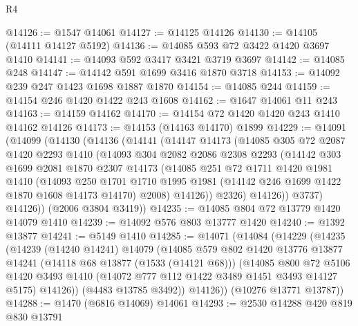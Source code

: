 \begin{lexlean}{R4}
\begin{coremodule}
@14126 := @1547 @14061
@14127 := @14125 @14126
@14130 := @14105 (@14111 @14127 @5192)
@14136 := @14085 @593 @72 @3422 @1420 @3697 @1410
@14141 := @14093 @592 @3417 @3421 @3719 @3697
@14142 := @14085 @248
@14147 := @14142 @591 @1699 @3416 @1870 @3718
@14153 := @14092 @239 @247 @1423 @1698 @1887 @1870
@14154 := @14085 @244
@14159 := @14154 @246 @1420 @1422 @243 @1608
@14162 := @1647 @14061 @11 @243
@14163 := @14159 @14162
@14170 := @14154 @72 @1420 @1420 @243 @1410 @14162 @14126
@14173 := @14153 (@14163 @14170) @1899
@14229 := @14091
    (@14099
      (@14130
        (@14136
          (@14141
            (@14147
              @14173
              (@14085
                @305
                @72
                @2087
                @1420
                @2293
                @1410
                (@14093
                  @304
                  @2082
                  @2086
                  @2308
                  @2293
                  (@14142
                    @303
                    @1699
                    @2081
                    @1870
                    @2307
                    @14173
                    (@14085
                      @251
                      @72
                      @1711
                      @1420
                      @1981
                      @1410
                      (@14093
                        @250
                        @1701
                        @1710
                        @1995
                        @1981
                        (@14142 @246 @1699 @1422 @1870 @1608 @14173 @14170)
                        @2008)
                      @14126))
                  @2326)
                @14126))
            @3737)
          @14126))
      (@2006 @3804 @3419))
@14235 := @14085 @804 @72 @13779 @1420 @14079 @1410
@14239 := @14092 @576 @803 @13777 @1420
@14240 := @1392 @13877
@14241 := @5149 @1410
@14285 := @14071
    (@14084
      (@14229
        (@14235
          (@14239
            (@14240 @14241)
            @14079
            (@14085
              @579
              @802
              @1420
              @13776
              @13877
              @14241
              (@14118 @68 @13877 (@1533 (@14121 @68)))
              (@14085
                @800
                @72
                @5106
                @1420
                @3493
                @1410
                (@14072 @777 @112 @1422 @3489 @1451 @3493 @14127 @5175)
                @14126))
            (@4483 @13785 @3492))
          @14126))
      (@10276 @13771 @13787))
@14288 := @1470 (@6816 @14069) @14061
@14293 := @2530 @14288 @420 @819 @830 @13791

\end{coremodule}
\end{lexlean}
